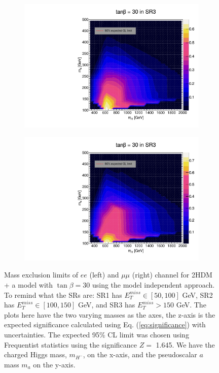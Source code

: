 \documentclass[12pt, a4paper]{book}
\begin{document}
\begin{figure}[!ht]
\begin{subfigure}[b]{0.49\textwidth}
      \includegraphics[width=1\textwidth]{Limits/Model_independent/150/2HDM/2HDM_ee_tb30.pdf}
   \end{subfigure}
   \hfill
   \begin{subfigure}[b]{0.49\textwidth}
      \centering
      \includegraphics[width=1\textwidth]{Limits/Model_independent/150/2HDM/2HDM_uu_tb30.pdf}
   \end{subfigure}
   \caption[Expected mass exclusion limits results for 2HDM + a model with $\tan\beta=30$ on $ee$ and $\mu\mu$ channel using the model independent approach]{Mass exclusion limits of $ee$ (left) and $\mu\mu$ (right) channel for 2HDM + a model with $\tan\beta=30$ using the model independent approach. To remind what the SRs are: SR1 has $E_T^{miss}\in[50, 100]$ GeV, SR2 has $E_T^{miss}\in[100, 150]$ GeV, and SR3 has $E_T^{miss}>150$ GeV. The plots here have the two varying masses as the axes, the z-axis is the expected significance calculated using Eq. (\ref{eq:significance}) with uncertainties. The expected 95\% CL limit was chosen using Frequentist statistics using the significance $Z=$ 1.645.   
   We have the charged Higgs mass, $m_{H^-}$, on the x-axis, and the pseudoscalar $a$ mass $m_{a}$ on the y-axis.}
\end{figure}
\end{document}
